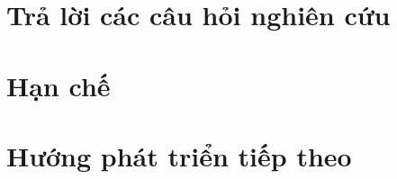 \documentclass[a4paper,12pt]{report}
\begin{document}
\section{Trả lời các câu hỏi nghiên cứu}

\section{Hạn chế}

\section{Hướng phát triển tiếp theo}

\end{document}
